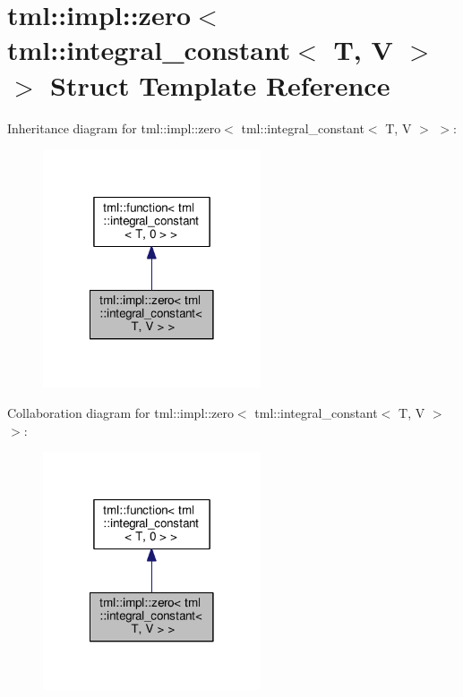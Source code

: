 \hypertarget{structtml_1_1impl_1_1zero_3_01tml_1_1integral__constant_3_01_t_00_01_v_01_4_01_4}{\section{tml\+:\+:impl\+:\+:zero$<$ tml\+:\+:integral\+\_\+constant$<$ T, V $>$ $>$ Struct Template Reference}
\label{structtml_1_1impl_1_1zero_3_01tml_1_1integral__constant_3_01_t_00_01_v_01_4_01_4}
}


Inheritance diagram for tml\+:\+:impl\+:\+:zero$<$ tml\+:\+:integral\+\_\+constant$<$ T, V $>$ $>$\+:
\nopagebreak
\begin{figure}[H]
\begin{center}
\leavevmode
\includegraphics[width=182pt]{structtml_1_1impl_1_1zero_3_01tml_1_1integral__constant_3_01_t_00_01_v_01_4_01_4__inherit__graph}
\end{center}
\end{figure}


Collaboration diagram for tml\+:\+:impl\+:\+:zero$<$ tml\+:\+:integral\+\_\+constant$<$ T, V $>$ $>$\+:
\nopagebreak
\begin{figure}[H]
\begin{center}
\leavevmode
\includegraphics[width=182pt]{structtml_1_1impl_1_1zero_3_01tml_1_1integral__constant_3_01_t_00_01_v_01_4_01_4__coll__graph}
\end{center}
\end{figure}
